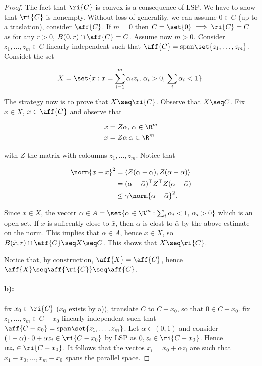 \begin{proof}
    
    The fact that $\ri{C}$ is convex is a consequence of LSP. We have to show that $\ri{C}$ is nonempty. Without loss of generality, we can assume $0 \in C$ (up to a traslation), consider $\aff{C}$. If $m = 0$ then $C = \set{0} \implies \ri{C} = C$ as for any $r > 0$, $B(0,r) \cap \aff{C} = C$. Assume now $m > 0$. Consider $z_1,\dots,z_m \in C$ linearly independent such that $\aff{C} = \mathrm{span}\set{z_1,\dots,z_m}$. Considet the set 

    \[ X = \set{x : x = \sum_{i=1}^m \alpha_i z_i,\,\alpha_i > 0,\, \sum_i \alpha_i < 1}. \]

    The strategy now is to prove that $X \seq \ri{C}$. Observe that $X \seq C$. Fix $\bar{x} \in X$, $x \in \aff{C}$ and observe that 
    
    \begin{align*}
        \bar{x} &= Z \bar{\alpha},\, \bar{\alpha } \in \R^m \\
        x &= Z \alpha \, \alpha \in \R^m
    \end{align*}

    with $Z$ the matrix with coloumns $z_1,\dots,z_m$. Notice that 

    \begin{align*}
        \norm{x - \bar{x}}^2 &= \langle Z(\alpha - \bar{\alpha}), Z(\alpha - \bar{\alpha}) \rangle \\
            &= (\alpha - \bar{\alpha})^\top Z^\top Z (\alpha - \bar{\alpha}) \\
            &\le \gamma \norm{\alpha - \bar{\alpha}}^2.
    \end{align*}

    Since $\bar{x} \in X$, the vecotr $\bar{\alpha} \in A = \set{\alpha \in \R^m : \sum_{i} \alpha_i < 1, \, \alpha_i > 0}$ which is an open set. If $x$ is suficently close to $\bar{x}$, then $\alpha$ is clost to $\bar{\alpha}$ by the above estimate on the norm. This implies that $\alpha \in A$, hence $x \in X$, so $B(\bar{x},r) \cap \aff{C} \seq X \seq C$. This shows that $X \seq \ri{C}$.

    Notice that, by construction, $\aff{X} = \aff{C}$, hence $\aff{X} \seq \aff{\ri{C}} \seq \aff{C}$.

    \paragraph{b):} fix $x_0 \in \ri{C}$ ($x_0$ exists by a)), translate $C$ to $C - x_0$, so that $0 \in C - x_0$. fix $z_1,\dots,z_m \in C - x_0$ linearly independent such that $\aff{C - x_0} = \mathrm{span}\set{z_1,\dots,z_m}$. Let $\alpha \in (0,1)$ and consider $(1-\alpha)\cdot 0 + \alpha z_i \in \ri{C-x_0}$ by LSP as $0,z_i \in \ri{C-x_0}$. Hence $\alpha z_i \in \ri{C-x_0}$. It follows that the vectos $x_i = x_0 + \alpha z_i$ are such that $x_1 - x_0, \dots, x_m-x_0$ spans the parallel space.

\end{proof}

